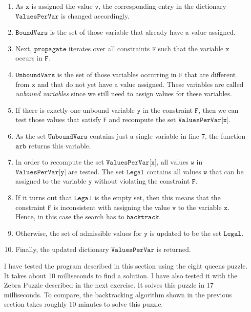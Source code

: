 \begin{enumerate}
\item As $\texttt{x}$ is assigned the value $\texttt{v}$, the corresponding entry in the dictionary
      $\texttt{ValuesPerVar}$ is changed accordingly. 
\item $\texttt{BoundVars}$ is the set of those variable that already have a value assigned.
\item Next, $\texttt{propagate}$ iterates over all  constraints $\texttt{F}$ such that the variable
      $\texttt{x}$ occurs in $\texttt{F}$.
\item $\texttt{UnboundVars}$ is the set of those variables occurring in $\texttt{F}$ that are different from
      $\texttt{x}$ and that do not yet have a value assigned.  These variables are called \emph{unbound variables} 
      since we still need to assign values for these variables.
\item If there is exactly one unbound variable $\texttt{y}$ in the constraint $\texttt{F}$, then we can test
      those values that satisfy \texttt{F} and recompute the set $\texttt{ValuesPerVar[x]}$.
\item As the set $\texttt{UnboundVars}$ contains just a single variable in line 7,
      the function $\texttt{arb}$ returns this variable.
\item In order to recompute the set $\texttt{ValuesPerVar[x]}$,  all values $\texttt{w}$ in
      $\texttt{ValuesPerVar[y]}$ are tested.  The set $\texttt{Legal}$ contains all values $\texttt{w}$ that can
      be assigned to the variable $\texttt{y}$ without violating the constraint $\texttt{F}$.
\item If it turns out that $\texttt{Legal}$ is the empty set, then this means that the constraint
      $\texttt{F}$ is inconsistent with assigning the value $\texttt{v}$ to the variable
      $\texttt{x}$.  Hence, in this case the  search has to  $\texttt{backtrack}$.
\item Otherwise, the set of admissible values for $\texttt{y}$ is updated to be the set $\texttt{Legal}$.
\item Finally, the updated dictionary $\mathtt{ValuesPerVar}$ is returned.
\end{enumerate}
I have tested the program described in this section using the eight queens puzzle.  It takes about
10 milliseconds to find a solution.  I have also tested it with the Zebra Puzzle described in the next exercise.
It solves this puzzle in 17 milliseconds.  To compare, the backtracking algorithm shown in the previous section
takes roughly 10 minutes to solve this puzzle.
\pagebreak

